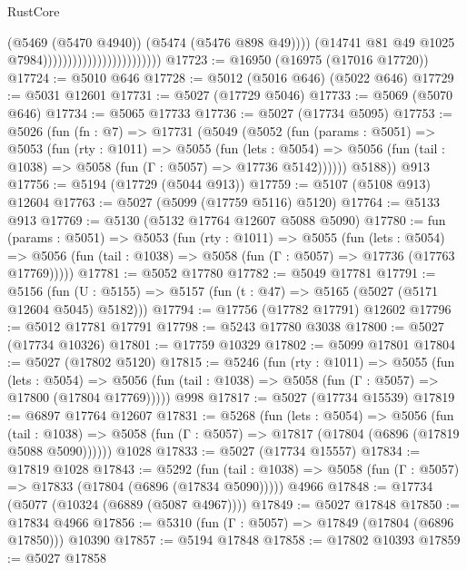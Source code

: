 \begin{lexlean}{RustCore}
\begin{coremodule}
                                                      (@5469 (@5470 @4940))
                                                      (@5474 (@5476 @898 @49))))
                                                  (@14741
                                                    @81
                                                    @49
                                                    @1025
                                                    @7984))))))))))))))))))))))))
@17723 := @16950 (@16975 (@17016 @17720))
@17724 := @5010 @646
@17728 := @5012 (@5016 @646) (@5022 @646)
@17729 := @5031 @12601
@17731 := @5027 (@17729 @5046)
@17733 := @5069 (@5070 @646)
@17734 := @5065 @17733
@17736 := @5027 (@17734 @5095)
@17753 := @5026
    (fun (fn : @7) =>
    @17731
      (@5049
        (@5052
          (fun (params : @5051) =>
          @5053
            (fun (rty : @1011) =>
            @5055
              (fun (lets : @5054) =>
              @5056 (fun (tail : @1038) => @5058 (fun (Γ : @5057) => @17736 @5142))))))
        @5188))
    @913
@17756 := @5194 (@17729 (@5044 @913))
@17759 := @5107 (@5108 @913) @12604
@17763 := @5027 (@5099 (@17759 @5116) @5120)
@17764 := @5133 @913
@17769 := @5130 (@5132 @17764 @12607 @5088 @5090)
@17780 := fun (params : @5051) =>
  @5053
    (fun (rty : @1011) =>
    @5055
      (fun (lets : @5054) =>
      @5056 (fun (tail : @1038) => @5058 (fun (Γ : @5057) => @17736 (@17763 @17769)))))
@17781 := @5052 @17780
@17782 := @5049 @17781
@17791 := @5156
    (fun (U : @5155) => @5157 (fun (t : @47) => @5165 (@5027 (@5171 @12604 @5045) @5182)))
@17794 := @17756 (@17782 @17791) @12602
@17796 := @5012 @17781 @17791
@17798 := @5243 @17780 @3038
@17800 := @5027 (@17734 @10326)
@17801 := @17759 @10329
@17802 := @5099 @17801
@17804 := @5027 (@17802 @5120)
@17815 := @5246
    (fun (rty : @1011) =>
    @5055
      (fun (lets : @5054) =>
      @5056 (fun (tail : @1038) => @5058 (fun (Γ : @5057) => @17800 (@17804 @17769)))))
    @998
@17817 := @5027 (@17734 @15539)
@17819 := @6897 @17764 @12607
@17831 := @5268
    (fun (lets : @5054) =>
    @5056
      (fun (tail : @1038) =>
      @5058 (fun (Γ : @5057) => @17817 (@17804 (@6896 (@17819 @5088 @5090))))))
    @1028
@17833 := @5027 (@17734 @15557)
@17834 := @17819 @1028
@17843 := @5292
    (fun (tail : @1038) => @5058 (fun (Γ : @5057) => @17833 (@17804 (@6896 (@17834 @5090)))))
    @4966
@17848 := @17734 (@5077 (@10324 (@6889 (@5087 @4967))))
@17849 := @5027 @17848
@17850 := @17834 @4966
@17856 := @5310 (fun (Γ : @5057) => @17849 (@17804 (@6896 @17850))) @10390
@17857 := @5194 @17848
@17858 := @17802 @10393
@17859 := @5027 @17858

\end{coremodule}
\end{lexlean}
